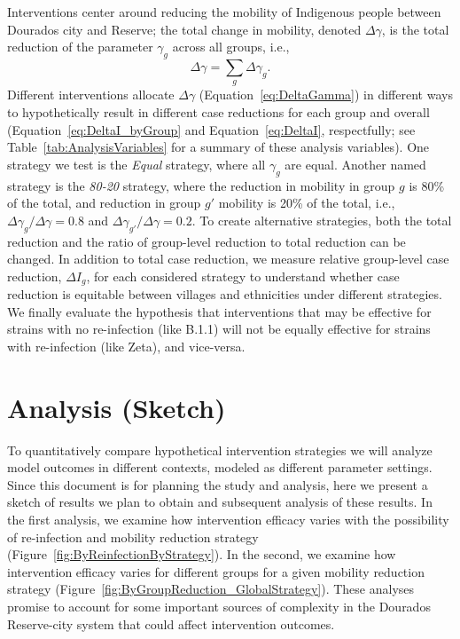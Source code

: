 \documentclass[
  letterpaper,
  abstract]{scrartcl}
\begin{document}
Interventions center around reducing the mobility of Indigenous people between
Dourados city and Reserve; the total change in mobility, denoted $\Delta
\gamma$, is the total reduction of the parameter $\gamma_g$ across all 
groups, i.e., 
\begin{equation}
  \Delta \gamma = \sum_g \Delta \gamma_g.
  \label{eq:DeltaGamma}
\end{equation}
\noindent
Different interventions allocate $\Delta \gamma$ (Equation~\ref{eq:DeltaGamma})
in different ways to hypothetically result in different case reductions for each
group and overall (Equation~\ref{eq:DeltaI_byGroup} and Equation~\ref{eq:DeltaI},
respectfully; see Table~\ref{tab:AnalysisVariables} for a summary of these analysis
variables).
One strategy we test is the \emph{Equal} strategy, where all $\gamma_g$ are
equal. Another named strategy is the \emph{80-20} strategy, where the
reduction in mobility in group $g$ is 80\% of the total, and reduction in
group $g'$ mobility is 20\% of the total, i.e., $\Delta\gamma_g / \Delta\gamma =
0.8$ and $\Delta\gamma_{g'} / \Delta\gamma = 0.2$. To create alternative
strategies, both the total reduction and the ratio of group-level reduction to 
total reduction can be changed. In addition to total case reduction, we 
measure relative group-level case reduction, $\Delta I_g$, 
for each considered strategy to understand whether case reduction is equitable
between villages and ethnicities under different strategies. 
We finally evaluate the hypothesis that interventions that may be effective for
strains with no re-infection (like B.1.1) will not be equally effective for
strains with re-infection (like Zeta), and vice-versa. 


\section{Analysis (Sketch)}\label{analysis-sketch}


To quantitatively compare hypothetical intervention strategies we will analyze 
model outcomes in different contexts, modeled as different parameter settings.
Since this document is for planning the study and analysis, here we present a sketch
of results we plan to obtain and subsequent analysis of these results. In the first
analysis, we examine how intervention efficacy varies with the possibility of
re-infection and mobility reduction strategy
(Figure~\ref{fig:ByReinfectionByStrategy}). In the second, we examine how
intervention efficacy varies for different groups for a given mobility reduction
strategy (Figure~\ref{fig:ByGroupReduction_GlobalStrategy}). These analyses 
promise to account for some important sources of complexity in 
the Dourados Reserve-city system that could affect intervention outcomes.
\end{document}

